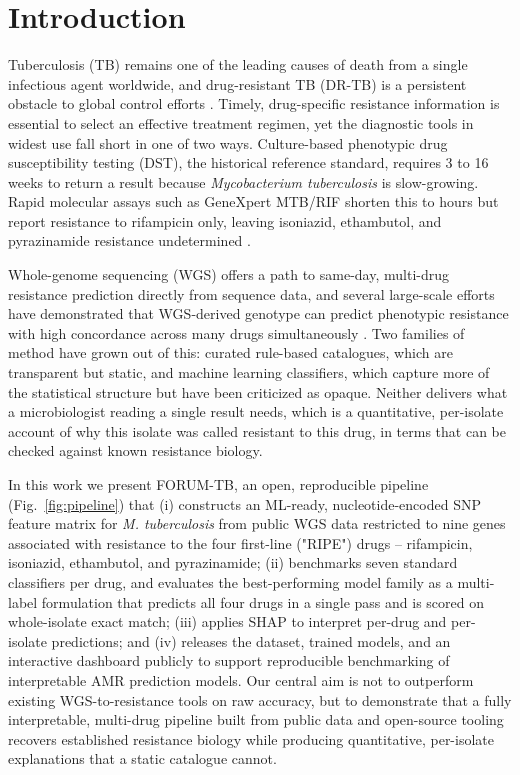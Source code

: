 \section{Introduction}

Tuberculosis (TB) remains one of the leading causes of death from a single infectious agent worldwide, and drug-resistant TB (DR-TB) is a persistent obstacle to global control efforts \cite{who2025globaltb}. Timely, drug-specific resistance information is essential to select an effective treatment regimen, yet the diagnostic tools in widest use fall short in one of two ways. Culture-based phenotypic drug susceptibility testing (DST), the historical reference standard, requires 3 to 16 weeks to return a result because \emph{Mycobacterium tuberculosis} is slow-growing. Rapid molecular assays such as GeneXpert MTB/RIF shorten this to hours but report resistance to rifampicin only, leaving isoniazid, ethambutol, and pyrazinamide resistance undetermined \cite{helb2010genexpert}.

Whole-genome sequencing (WGS) offers a path to same-day, multi-drug resistance prediction directly from sequence data, and several large-scale efforts have demonstrated that WGS-derived genotype can predict phenotypic resistance with high concordance across many drugs simultaneously \cite{walker2015whole,cryptic2022compendium}. Two families of method have grown out of this: curated rule-based catalogues, which are transparent but static, and machine learning classifiers, which capture more of the statistical structure but have been criticized as opaque. Neither delivers what a microbiologist reading a single result needs, which is a quantitative, per-isolate account of why this isolate was called resistant to this drug, in terms that can be checked against known resistance biology.

In this work we present FORUM-TB, an open, reproducible pipeline (Fig.~\ref{fig:pipeline}) that (i) constructs an ML-ready, nucleotide-encoded SNP feature matrix for \emph{M. tuberculosis} from public WGS data restricted to nine genes associated with resistance to the four first-line ("RIPE") drugs -- rifampicin, isoniazid, ethambutol, and pyrazinamide; (ii) benchmarks seven standard classifiers per drug, and evaluates the best-performing model family as a multi-label formulation that predicts all four drugs in a single pass and is scored on whole-isolate exact match; (iii) applies SHAP to interpret per-drug and per-isolate predictions; and (iv) releases the dataset, trained models, and an interactive dashboard publicly to support reproducible benchmarking of interpretable AMR prediction models. Our central aim is not to outperform existing WGS-to-resistance tools on raw accuracy, but to demonstrate that a fully interpretable, multi-drug pipeline built from public data and open-source tooling recovers established resistance biology while producing quantitative, per-isolate explanations that a static catalogue cannot.


